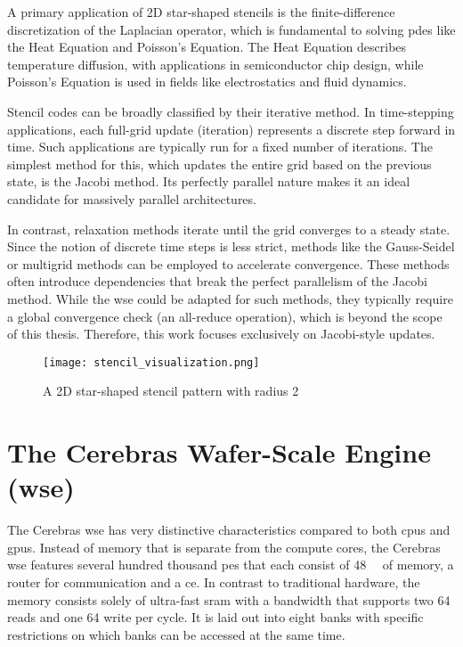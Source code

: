 A primary application of 2D star-shaped stencils is the finite-difference discretization of the Laplacian operator, which is fundamental to solving \acp{pde} like the Heat Equation and Poisson's Equation. The Heat Equation describes temperature diffusion, with applications in semiconductor chip design, while Poisson's Equation is used in fields like electrostatics and fluid dynamics.

Stencil codes can be broadly classified by their iterative method. In time-stepping applications, each full-grid update (iteration) represents a discrete step forward in time. Such applications are typically run for a fixed number of iterations. The simplest method for this, which updates the entire grid based on the previous state, is the Jacobi method. Its perfectly parallel nature makes it an ideal candidate for massively parallel architectures.

In contrast, relaxation methods iterate until the grid converges to a steady state. Since the notion of discrete time steps is less strict, methods like the Gauss-Seidel or multigrid methods can be employed to accelerate convergence. These methods often introduce dependencies that break the perfect parallelism of the Jacobi method. While the \ac{wse} could be adapted for such methods, they typically require a global convergence check (an all-reduce operation), which is beyond the scope of this thesis. Therefore, this work focuses exclusively on Jacobi-style updates.

\begin{figure}[h]
    \centering
    \texttt{[image: stencil\_visualization.png]}
    \caption{A 2D star-shaped stencil pattern with radius 2}
    \label{fig:stencil_visualization}
\end{figure}

\section{The Cerebras Wafer-Scale Engine (\ac{wse})}
The Cerebras \ac{wse} has very distinctive characteristics compared to both \acp{cpu} and \acp{gpu}.
Instead of memory that is separate from the compute cores, the Cerebras \ac{wse} features several hundred thousand \acp{pe} that each consist of \qty{48}{\kilo\byte} of memory, a router for communication and a \ac{ce}. In contrast to traditional hardware, the memory consists solely of ultra-fast \ac{sram} with a bandwidth that supports two \qty{64}{\bit} reads and one \qty{64}{\bit} write per cycle. It is laid out into eight banks with specific restrictions on which banks can be accessed at the same time.

